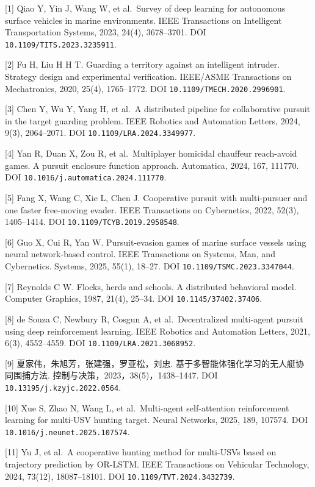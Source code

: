 \documentclass[
  11pt,
  fontset=none]{ctexart}
\begin{document}
{[}1{]} Qiao Y, Yin J, Wang W, et al.~Survey of deep learning for
autonomous surface vehicles in marine environments. IEEE Transactions on
Intelligent Transportation Systems, 2023, 24(4), 3678--3701. DOI
\nolinkurl{10.1109/TITS.2023.3235911}.

{[}2{]} Fu H, Liu H H T. Guarding a territory against an intelligent
intruder. Strategy design and experimental verification. IEEE/ASME
Transactions on Mechatronics, 2020, 25(4), 1765--1772. DOI
\nolinkurl{10.1109/TMECH.2020.2996901}.

{[}3{]} Chen Y, Wu Y, Yang H, et al.~A distributed pipeline for
collaborative pursuit in the target guarding problem. IEEE Robotics and
Automation Letters, 2024, 9(3), 2064--2071. DOI
\nolinkurl{10.1109/LRA.2024.3349977}.

{[}4{]} Yan R, Duan X, Zou R, et al.~Multiplayer homicidal chauffeur
reach-avoid games. A pursuit enclosure function approach. Automatica,
2024, 167, 111770. DOI \nolinkurl{10.1016/j.automatica.2024.111770}.

{[}5{]} Fang X, Wang C, Xie L, Chen J. Cooperative pursuit with
multi-pursuer and one faster free-moving evader. IEEE Transactions on
Cybernetics, 2022, 52(3), 1405--1414. DOI
\nolinkurl{10.1109/TCYB.2019.2958548}.

{[}6{]} Guo X, Cui R, Yan W. Pursuit-evasion games of marine surface
vessels using neural network-based control. IEEE Transactions on
Systems, Man, and Cybernetics. Systems, 2025, 55(1), 18--27. DOI
\nolinkurl{10.1109/TSMC.2023.3347044}.

{[}7{]} Reynolds C W. Flocks, herds and schools. A distributed
behavioral model. Computer Graphics, 1987, 21(4), 25--34. DOI
\nolinkurl{10.1145/37402.37406}.

{[}8{]} de Souza C, Newbury R, Cosgun A, et al.~Decentralized
multi-agent pursuit using deep reinforcement learning. IEEE Robotics and
Automation Letters, 2021, 6(3), 4552--4559. DOI
\nolinkurl{10.1109/LRA.2021.3068952}.

{[}9{]} 夏家伟，朱旭芳，张建强，罗亚松，刘忠.
基于多智能体强化学习的无人艇协同围捕方法.
控制与决策，2023，38(5)，1438--1447. DOI
\nolinkurl{10.13195/j.kzyjc.2022.0564}.

{[}10{]} Xue S, Zhao N, Wang L, et al.~Multi-agent self-attention
reinforcement learning for multi-USV hunting target. Neural Networks,
2025, 189, 107574. DOI \nolinkurl{10.1016/j.neunet.2025.107574}.

{[}11{]} Yu J, et al.~A cooperative hunting method for multi-USVs based
on trajectory prediction by OR-LSTM. IEEE Transactions on Vehicular
Technology, 2024, 73(12), 18087--18101. DOI
\nolinkurl{10.1109/TVT.2024.3432739}.
\end{document}
